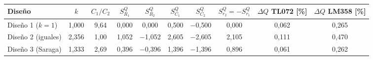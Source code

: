 \begin{tabular}{@{}lccccccccc@{}}
\toprule
Diseño & $k$ & $C_1/C_2$ & $S^Q_{R_1}$ & $S^Q_{R_2}$ & $S^Q_{C_1}$ & $S^Q_{C_2}$ & $S^Q_{r_2}=-S^Q_{r_1}$ & $\Delta Q$ TL072 [\%] & $\Delta Q$ LM358 [\%] \\
\midrule
Diseño 1 ($k=1$) & 1{,}000 & 9{,}64 & 0{,}000 & 0{,}000 & 0{,}500 & $-$0{,}500 & 0{,}000 & 0{,}062 & 0{,}265 \\
Diseño 2 (iguales) & 2{,}356 & 1{,}00 & 1{,}052 & $-$1{,}052 & 2{,}605 & $-$2{,}605 & 2{,}105 & 0{,}111 & 0{,}470 \\
Diseño 3 (Saraga) & 1{,}333 & 2{,}69 & 0{,}396 & $-$0{,}396 & 1{,}396 & $-$1{,}396 & 0{,}896 & 0{,}061 & 0{,}262 \\
\bottomrule
\end{tabular}